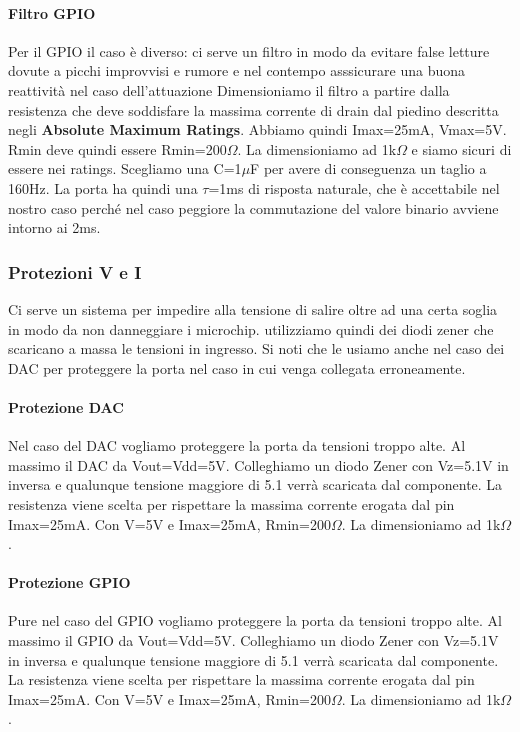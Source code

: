 \documentclass[10pt]{article}
\begin{document}
			\paragraph{Filtro GPIO}
				Per il GPIO il caso è diverso: ci serve un filtro in modo da evitare false letture dovute a picchi improvvisi e rumore e nel contempo asssicurare una buona reattività nel caso dell'attuazione
				Dimensioniamo il filtro a partire dalla resistenza che deve soddisfare la massima corrente di drain dal piedino descritta negli \textbf{Absolute Maximum Ratings}.
				Abbiamo quindi Imax=25mA, Vmax=5V. Rmin deve quindi essere Rmin=200\(\Omega\). La dimensioniamo ad 1k\(\Omega\) e siamo sicuri di essere nei ratings.
				Scegliamo una C=1\(\mu\)F per avere di conseguenza un taglio a 160Hz. La porta ha quindi una \(\tau\)=1ms di risposta naturale, che è accettabile nel nostro caso perché nel caso peggiore la commutazione del valore binario avviene intorno ai 2ms.
		\subsubsection{Protezioni V e I}
		Ci serve un sistema per impedire alla tensione di salire oltre ad una certa soglia in modo da non danneggiare i microchip. utilizziamo quindi dei diodi zener che scaricano a massa le tensioni in ingresso.
		Si noti che le usiamo anche nel caso dei DAC per proteggere la porta nel caso in cui venga collegata erroneamente.
			\paragraph{Protezione DAC}
				Nel caso del DAC vogliamo proteggere la porta da tensioni troppo alte. Al massimo il DAC da Vout=Vdd=5V. Colleghiamo un diodo Zener con Vz=5.1V in inversa e qualunque tensione maggiore di 5.1 verrà scaricata dal componente.
				La resistenza viene scelta per rispettare la massima corrente erogata dal pin Imax=25mA. Con V=5V e Imax=25mA, Rmin=200\(\Omega\). La dimensioniamo ad 1k\(\Omega\).
			\paragraph{Protezione GPIO}
				Pure nel caso del GPIO vogliamo proteggere la porta da tensioni troppo alte. Al massimo il GPIO da Vout=Vdd=5V. Colleghiamo un diodo Zener con Vz=5.1V in inversa e qualunque tensione maggiore di 5.1 verrà scaricata dal componente.
				La resistenza viene scelta per rispettare la massima corrente erogata dal pin Imax=25mA. Con V=5V e Imax=25mA, Rmin=200\(\Omega\). La dimensioniamo ad 1k\(\Omega\).
\end{document}
